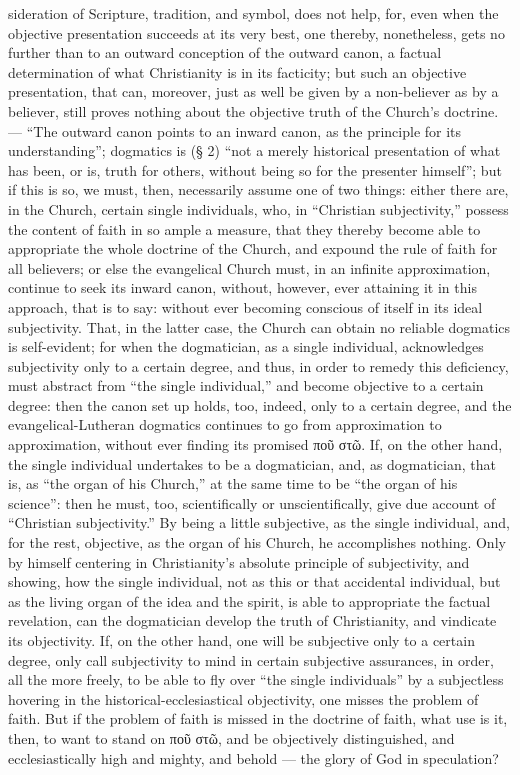 \documentclass[12pt]{book}
\begin{document}
sideration of Scripture, tradition, and symbol, does not help, for, even when the objective presentation succeeds at its very best, one thereby, nonetheless, gets no further than to an outward conception of the outward canon, a factual determination of what Christianity is in its facticity; but such an objective presentation, that can, moreover, just as well be given by a non-believer as by a believer, still proves nothing about the objective truth of the Church's doctrine. --- ``The outward canon points to an inward canon, as the principle for its understanding''; dogmatics is (§ 2) ``not a merely historical presentation of what has been, or is, truth for others, without being so for the presenter himself''; but if this is so, we must, then, necessarily assume one of two things: either there are, in the Church, certain single individuals, who, in ``Christian subjectivity,'' possess the content of faith in so ample a measure, that they thereby become able to appropriate the whole doctrine of the Church, and expound the rule of faith for all believers; or else the evangelical Church must, in an infinite approximation, continue to seek its inward canon, without, however, ever attaining it in this approach, that is to say: without ever becoming conscious of itself in its ideal subjectivity. That, in the latter case, the Church can obtain no reliable dogmatics is self-evident; for when the dogmatician, as a single individual, acknowledges subjectivity only to a certain degree, and thus, in order to remedy this deficiency, must abstract from ``the single individual,'' and become objective to a certain degree: then the canon set up
holds, too, indeed, only to a certain degree, and the evangelical-Lutheran dogmatics continues to go from approximation to approximation, without ever finding its promised ποῦ στῶ. If, on the other hand, the single individual undertakes to be a dogmatician, and, as dogmatician, that is, as ``the organ of his Church,'' at the same time to be ``the organ of his science'': then he must, too, scientifically or unscientifically, give due account of ``Christian subjectivity.'' By being a little subjective, as the single individual, and, for the rest, objective, as the organ of his Church, he accomplishes nothing. Only by himself centering in Christianity's absolute principle of subjectivity, and showing, how the single individual, not as this or that accidental individual, but as the living organ of the idea and the spirit, is able to appropriate the factual revelation, can the dogmatician develop the truth of Christianity, and vindicate its objectivity. If, on the other hand, one will be subjective only to a certain degree, only call subjectivity to mind in certain subjective assurances, in order, all the more freely, to be able to fly over ``the single individuals'' by a subjectless hovering in the historical-ecclesiastical objectivity, one misses the problem of faith. But if the problem of faith is missed in the doctrine of faith, what use is it, then, to want to stand on ποῦ στῶ, and be objectively distinguished, and ecclesiastically high and mighty, and behold --- the glory of God in speculation?
\end{document}

